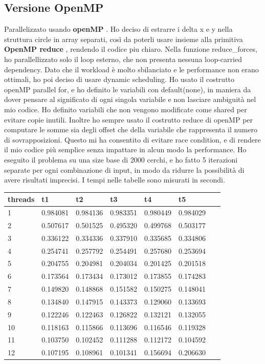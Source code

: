 \documentclass[a4paper,11pt, twoside]{report}
\begin{document}
\subsection*{Versione OpenMP}
Parallelizzato usando \textbf{openMP} \cite{openMP}.
Ho deciso di estrarre i delta x e y nella struttura circle in array separati, così da poterli usare insieme alla primitiva \textbf{OpenMP reduce} \cite{omp_reduce}, rendendo il codice piu chiaro.
Nella funzione reduce\_forces, ho parallellizzato solo il loop esterno, che non presenta nessuna loop-carried dependency.
Dato che il workload è molto sbilanciato e le performance non erano ottimali, ho poi deciso di usare dynamic scheduling.
Ho usato il costrutto openMP parallel for, e ho definito le variabili con default(none), in maniera da dover pensare al significato di ogni singola variabile e non lasciare ambiguità nel mio codice.
Ho definito variabili che non vengono modificate come shared per evitare copie inutili.
Inoltre ho sempre usato il costrutto reduce di openMP per computare le somme sia degli offset che della variabile che rappresenta il numero di sovrapposizioni.
Questo mi ha consentito di evitare race condition, e di rendere il mio codice più semplice senza impattare in alcun modo la performance.
Ho eseguito il problema su una size base di 2000 cerchi, e ho fatto 5 iterazioni separate per ogni combinazione di input, in modo da ridurre la possibilità di avere risultati imprecisi.
I tempi nelle tabelle sono misurati in secondi.
\begin{table}[!ht]
    \centering
    \begin{tabular}{|l|l|l|l|l|l|l|}
    \hline
        threads & t1 & t2 & t3 & t4 & t5 & ~ \\ \hline
        1 & 0.984081 & 0.984136 & 0.983351 & 0.980449 & 0.984029 & ~ \\ \hline
        2 & 0.507617 & 0.501525 & 0.495320 & 0.499768 & 0.503177 & ~ \\ \hline
        3 & 0.336122 & 0.334336 & 0.337910 & 0.335685 & 0.334806 & ~ \\ \hline
        4 & 0.254741 & 0.257792 & 0.254491 & 0.257680 & 0.253694 & ~ \\ \hline
        5 & 0.204755 & 0.204981 & 0.204034 & 0.201425 & 0.201518 & ~ \\ \hline
        6 & 0.173564 & 0.173434 & 0.173012 & 0.173855 & 0.174283 & ~ \\ \hline
        7 & 0.149820 & 0.148868 & 0.151582 & 0.150275 & 0.148041 & ~ \\ \hline
        8 & 0.134840 & 0.147915 & 0.143373 & 0.129060 & 0.133693 & ~ \\ \hline
        9 & 0.122246 & 0.122463 & 0.126822 & 0.132121 & 0.132055 & ~ \\ \hline
        10 & 0.118163 & 0.115866 & 0.113696 & 0.116546 & 0.119328 & ~ \\ \hline
        11 & 0.103750 & 0.102452 & 0.111288 & 0.112172 & 0.104592 & ~ \\ \hline
        12 & 0.107195 & 0.108961 & 0.101341 & 0.156694 & 0.206630 & ~ \\ \hline
    \end{tabular}
\end{table}
\end{document}

